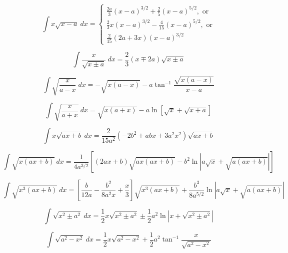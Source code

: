 \documentclass[12pt,letterpaper,leqno]{article}
\begin{document}
\begin{equation}\label{eq:Gilmore}
\int x\sqrt{x-a}\ dx =  
\left\{
\begin{array}{l}
\frac{2 a}{3} \left({x-a}\right)^{3/2} +\frac{2 }{5}\left( {x-a}\right)^{5/2},\text{ or} 
\\ \frac{2}{3} x(x-a)^{3/2} - \frac{4}{15} (x-a)^{5/2}, \text{ or}
\\ \frac{2}{15}(2a+3x)(x-a)^{3/2}
\end{array}
\right.
\end{equation}

\begin{equation}\label{eq:Weems}
\int \frac{x}{\sqrt{x\pm a} } \ dx = \frac{2}{3}(x\mp 2a)\sqrt{x\pm a}
\end{equation}

\begin{equation}
\int \sqrt{\frac{x}{a-x}}\ dx =  -\sqrt{x(a-x)}
-a\tan^{-1}\frac{\sqrt{x(a-x)}}{x-a}
\end{equation}

\begin{equation}
\int \sqrt{\frac{x}{a+x}}\ dx =  \sqrt{x(a+x)} 
-a\ln \left [ \sqrt{x} + \sqrt{x+a}\right] 
\end{equation}

\begin{equation}
\int x \sqrt{ax + b}\ dx =
\frac{2}{15 a^2}(-2b^2+abx + 3 a^2 x^2)
\sqrt{ax+b}
\end{equation}

\begin{equation}
\int \sqrt{x(ax+b)}\ dx = \frac{1}{4a^{3/2}}\left[(2ax + b)\sqrt{ax(ax+b)} 
-b^2 \ln \left| a\sqrt{x} + \sqrt{a(ax+b)} \right| \right ] 
\end{equation}

\begin{equation}
\int \sqrt{x^3(ax+b)} \ dx =\left [ 
\frac{b}{12a}-
\frac{b^2}{8a^2x}+
\frac{x}{3}\right] 
\sqrt{x^3(ax+b)}  + 
\frac{b^3}{8a^{5/2}}\ln \left | a\sqrt{x} + \sqrt{a(ax+b)} \right |
\end{equation}

\begin{equation}
\int\sqrt{x^2 \pm a^2}\ dx = \frac{1}{2}x\sqrt{x^2\pm a^2} 
\pm\frac{1}{2}a^2 \ln \left | x + \sqrt{x^2\pm a^2} \right | 
\end{equation}

\begin{equation}
\int  \sqrt{a^2 - x^2}\ dx = \frac{1}{2} x \sqrt{a^2-x^2} 
+\frac{1}{2}a^2\tan^{-1}\frac{x}{\sqrt{a^2-x^2}}
\end{equation}
\end{document}
